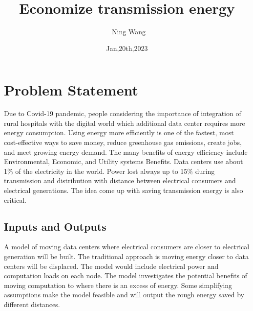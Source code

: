 \documentclass{article}
\title{Economize transmission energy\\\progname}
\author{\ Ning Wang}
\date{Jan,20th,2023}
\begin{document}
\maketitle


\section{Problem Statement}

Due to Covid-19 pandemic, people considering the importance of integration of rural hospitals with the digital world which additional data center requires more energy consumption.
Using energy more efficiently is one of the fastest, most cost-effective ways to save money, reduce greenhouse gas emissions, create jobs, and meet growing energy demand. The many benefits of energy efficiency include Environmental, Economic, and Utility systems Benefits. Data centers use about 1\% of the electricity in the world. Power lost always up to 15\% during  transmission and distribution with distance between electrical consumers and electrical generations. The idea come up with saving transmission energy is also critical.



\subsection{Inputs and Outputs}
A model of moving data centers where electrical consumers are closer to electrical generation will be built.
The traditional approach is moving energy closer to data centers will be displaced.
 The model would include electrical power and computation loads on each node. The model investigates the potential benefits of moving computation to where there is an excess of energy. Some simplifying assumptions make the model feasible and will output the rough energy saved by different distances. 
\end{document}
